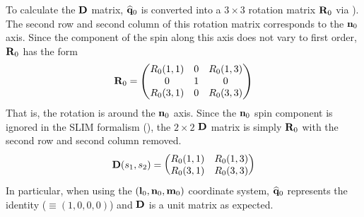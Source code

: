 To calculate the ${\bf D}$ matrix, $\widehat{{\bf q}}_0$ is converted into a $3 \times 3$ rotation matrix
${\bf R}_0$ via ). The second row and second column of this rotation matrix corresponds to the
${\bf n}_0$ axis. Since the component of the spin along this axis does not vary to first order,
${\bf R}_0$ has the form
\begin{equation}
  {\bf R}_0 = \begin{pmatrix}
      R_0(1,1) & 0 & R_0(1,3) \\
      0        & 1 & 0        \\
      R_0(3,1) & 0 & R_0(3,3)
  \end{pmatrix}
\end{equation}
That is, the rotation is around the ${\bf n}_0$ axis. Since the ${\bf n}_0$ spin component is ignored in
the SLIM formalism (), the $2 \times 2$ ${\bf D}$ matrix is simply ${\bf R}_0$ with the second
row and second column removed.
\begin{equation}
  {\bf D}(s_1, s_2) = \begin{pmatrix}
      R_0(1,1) & R_0(1,3) \\
      R_0(3,1) & R_0(3,3)
  \end{pmatrix}
\end{equation}
In particular, when using the $({\bf l}_0, {\bf n}_0, {\bf m}_0)$ coordinate system, $\widehat {{\bf q}}_0$
represents the identity ($\equiv (1, 0, 0, 0)$) and ${\bf D}$ is a unit matrix as expected.

